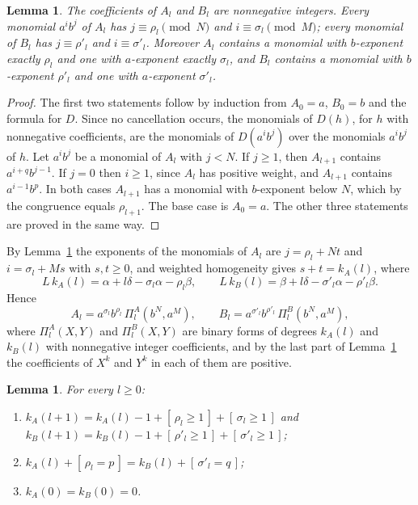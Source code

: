 \documentclass[11pt]{amsart}
\newtheorem{lemma}[theorem]{Lemma}
\theoremstyle{definition}
\theoremstyle{remark}
\numberwithin{equation}{section}
\newcommand{\ind}[1]{[\,#1\,]}
\begin{document}
\begin{lemma}\label{lem:extreme}
The coefficients of $A_l$ and $B_l$ are nonnegative integers. Every monomial $a^ib^j$ of $A_l$ has $j\equiv\rho_l\pmod N$ and $i\equiv\sigma_l\pmod M$; every monomial of $B_l$ has $j\equiv\rho'_l$ and $i\equiv\sigma'_l$. Moreover $A_l$ contains a monomial with $b$-exponent exactly $\rho_l$ and one with $a$-exponent exactly $\sigma_l$, and $B_l$ contains a monomial with $b$-exponent $\rho'_l$ and one with $a$-exponent $\sigma'_l$.
\end{lemma}

\begin{proof}
The first two statements follow by induction from $A_0=a$, $B_0=b$ and the formula for $D$. Since no cancellation occurs, the monomials of $D(h)$, for $h$ with nonnegative coefficients, are the monomials of $D(a^ib^j)$ over the monomials $a^ib^j$ of $h$. Let $a^ib^j$ be a monomial of $A_l$ with $j<N$. If $j\ge1$, then $A_{l+1}$ contains $a^{i+q}b^{j-1}$. If $j=0$ then $i\ge1$, since $A_l$ has positive weight, and $A_{l+1}$ contains $a^{i-1}b^{p}$. In both cases $A_{l+1}$ has a monomial with $b$-exponent below $N$, which by the congruence equals $\rho_{l+1}$. The base case is $A_0=a$. The other three statements are proved in the same way.
\end{proof}

By Lemma~\ref{lem:extreme} the exponents of the monomials of $A_l$ are $j=\rho_l+Nt$ and $i=\sigma_l+Ms$ with $s,t\ge0$, and weighted homogeneity gives $s+t=k_A(l)$, where
\begin{equation}\label{eq:kA}
L\,k_A(l)=\alpha+l\delta-\sigma_l\alpha-\rho_l\beta,\qquad L\,k_B(l)=\beta+l\delta-\sigma'_l\alpha-\rho'_l\beta .
\end{equation}
Hence
\begin{equation}\label{eq:binaryform}
A_l=a^{\sigma_l}b^{\rho_l}\,\Pi^A_l(b^N,a^M),\qquad B_l=a^{\sigma'_l}b^{\rho'_l}\,\Pi^B_l(b^N,a^M),
\end{equation}
where $\Pi^A_l(X,Y)$ and $\Pi^B_l(X,Y)$ are binary forms of degrees $k_A(l)$ and $k_B(l)$ with nonnegative integer coefficients, and by the last part of Lemma~\ref{lem:extreme} the coefficients of $X^{k}$ and $Y^{k}$ in each of them are positive.

\begin{lemma}\label{lem:kcount}
For every $l\ge0$:
\begin{enumerate}[label=\textup{(\alph*)},leftmargin=*]
\item $k_A(l+1)=k_A(l)-1+\ind{\rho_l\ge1}+\ind{\sigma_l\ge1}$ and $k_B(l+1)=k_B(l)-1+\ind{\rho'_l\ge1}+\ind{\sigma'_l\ge1}$;
\item $k_A(l)+\ind{\rho_l=p}=k_B(l)+\ind{\sigma'_l=q}$;
\item $k_A(0)=k_B(0)=0$.
\end{enumerate}
\end{lemma}
\end{document}
